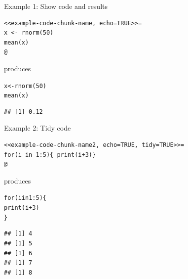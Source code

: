 \documentclass[10pt]{beamer}\usepackage[]{graphicx}\usepackage[]{color}
\makeatletter
\newcommand{\hlnum}[1]{\textcolor[rgb]{0.063,0.58,0.627}{#1}}%
\newcommand{\hlopt}[1]{\textcolor[rgb]{0.196,0.196,0.196}{#1}}%
\newcommand{\hlstd}[1]{\textcolor[rgb]{0.196,0.196,0.196}{#1}}%
\newcommand{\hlkwa}[1]{\textcolor[rgb]{0.231,0.416,0.784}{#1}}%
\newcommand{\hlkwb}[1]{\textcolor[rgb]{0.627,0,0.314}{#1}}%
\newcommand{\hlkwd}[1]{\textcolor[rgb]{0.78,0.227,0.412}{#1}}%
\newenvironment{kframe}{%
 \def\at@end@of@kframe{}%
 \ifinner\ifhmode%
  \def\at@end@of@kframe{\end{minipage}}%
  \begin{minipage}{\columnwidth}%
 \fi\fi%
 \def\FrameCommand##1{\hskip\@totalleftmargin \hskip-\fboxsep
 \colorbox{shadecolor}{##1}\hskip-\fboxsep
     \hskip-\linewidth \hskip-\@totalleftmargin \hskip\columnwidth}%
 \MakeFramed {\advance\hsize-\width
   \@totalleftmargin\z@ \linewidth\hsize
   \@setminipage}}%
 {\par\unskip\endMakeFramed%
 \at@end@of@kframe}
\newenvironment{knitrout}{}{} %
\makeatother
\begin{document}
\begin{frame}[fragile]{Example 1: Show code and results}
\begin{knitrout}
\color{fgcolor}\begin{kframe}
\begin{verbatim}
<<example-code-chunk-name, echo=TRUE>>=
x <- rnorm(50)
mean(x)
@
\end{verbatim}
\end{kframe}
\end{knitrout}
produces
\begin{knitrout}
\color{fgcolor}\begin{kframe}
\begin{alltt}
\hlstd{x} \hlkwb{<-} \hlkwd{rnorm}\hlstd{(}\hlnum{50}\hlstd{)}
\hlkwd{mean}\hlstd{(x)}
\end{alltt}
\begin{verbatim}
## [1] 0.12
\end{verbatim}
\end{kframe}
\end{knitrout}
\end{frame}


\begin{frame}[fragile]{Example 2: Tidy code}
\begin{knitrout}
\color{fgcolor}\begin{kframe}
\begin{verbatim}
<<example-code-chunk-name2, echo=TRUE, tidy=TRUE>>=
for(i in 1:5){ print(i+3)}
@
\end{verbatim}
\end{kframe}
\end{knitrout}
produces
\begin{knitrout}
\color{fgcolor}\begin{kframe}
\begin{alltt}
\hlkwa{for} \hlstd{(i} \hlkwa{in} \hlnum{1}\hlopt{:}\hlnum{5}\hlstd{) \{}
    \hlkwd{print}\hlstd{(i} \hlopt{+} \hlnum{3}\hlstd{)}
\hlstd{\}}
\end{alltt}
\begin{verbatim}
## [1] 4
## [1] 5
## [1] 6
## [1] 7
## [1] 8
\end{verbatim}
\end{kframe}
\end{knitrout}

\end{frame}
\end{document}
